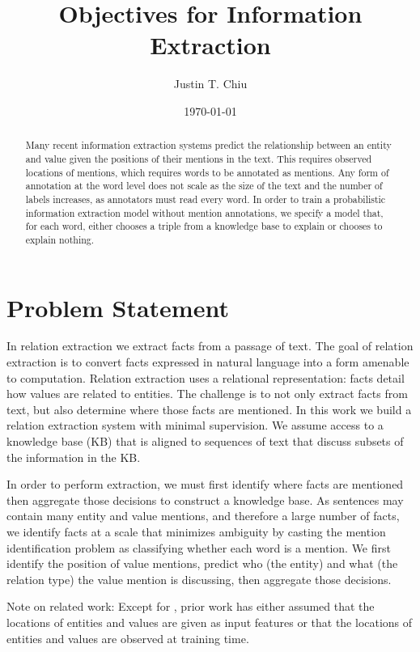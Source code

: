 \documentclass[12pt]{article}
\title{Objectives for Information Extraction}
\author{
Justin T. Chiu
}
\date{\today}
\begin{document}
\maketitle

\begin{abstract}
Many recent information extraction systems predict the relationship between
an entity and value given the positions of their mentions in the text.
This requires observed locations of mentions, which requires words to be annotated
as mentions.
Any form of annotation at the word level does not scale as the size of the text
and the number of labels increases, as annotators must read every word.
In order to train a probabilistic information extraction model without mention
annotations, we specify a model that, for each word,
either chooses a triple from a knowledge base to explain or chooses to explain nothing.
\end{abstract}

\section{Problem Statement}

In relation extraction we extract facts from a passage of text.
The goal of relation extraction is to convert facts expressed in natural language into a form
amenable to computation.
Relation extraction uses a relational representation: facts detail
how values are related to entities.
The challenge is to not only extract facts from text, but also
determine where those facts are mentioned.
In this work we build a relation extraction system with minimal supervision.
We assume access to a knowledge base (KB) that is aligned to sequences of text
that discuss subsets of the information in the KB.

In order to perform extraction, we must first identify where facts are mentioned
then aggregate those decisions to construct a knowledge base.
As sentences may contain many entity and value mentions, and therefore 
a large number of facts, we identify facts at a scale that minimizes ambiguity
by casting the mention identification problem as classifying whether each word is a mention.
We first identify the position of value mentions,
predict who (the entity) and what (the relation type) the value mention
is discussing, then aggregate those decisions.

Note on related work:
Except for \citet{zeng2018copy}, prior work has either assumed that the locations of
entities and values are given as input features or that the locations of entities and values
are observed at training time.
\end{document}
